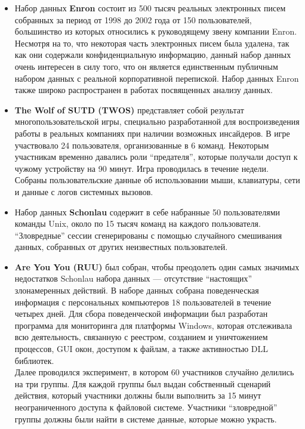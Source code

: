 \begin{itemize}
\item Набор данных \textbf{Enron} состоит из 500 тысяч реальных электронных писем собранных за период от 1998 до 2002 года от 150 пользователей, большинство из которых относились к руководящему звену компании Enron. Несмотря на то, что некоторая часть электронных писем была удалена, так как они содержали конфиденциальную информацию, данный набор данных очень интересен в силу того, что он является единственным публичным набором данных с реальной корпоративной перепиской. Набор данных Enron также широко распространен в работах посвященных анализу данных.\\
\item \textbf{The Wolf of SUTD (TWOS)} представляет собой результат многопользовательской игры, специально разработанной для воспроизведения работы в реальных компаниях при наличии возможных инсайдеров. В игре участвовало 24 пользователя, организованные в 6 команд. Некоторым участникам временно давались роли ``предателя'', которые получали доступ к чужому устройству на 90 минут. Игра проводилась в течение недели. Собраны пользовательские данные об использовании мыши, клавиатуры, сети и данные с логов системных вызовов. \\ 
\item Набор данных \textbf{Schonlau} содержит в себе набранные 50 пользователями команды Unix, около по 15 тысяч команд на каждого пользователя. ``Зловредные'' сессии сгенерированы с помощью случайного смешивания данных, собранных от других неизвестных пользователей.\\
\item \textbf{Are You You (RUU)} был собран, чтобы преодолеть один самых значимых недостатков Schonlau набора данных --- отсутствие ``настоящих'' злонамеренных действий. В наборе данных собрана поведенческая информация с персональных компьютеров 18 пользователей в течение четырех дней. Для сбора поведенческой информации был разработан программа для мониторинга для платформы Windows, которая отслеживала всю деятельность, связанную с реестром, созданием и уничтожением процессов, GUI окон, доступом к файлам, а также активностью DLL библиотек.\\ Далее проводился эксперимент, в котором 60 участников случайно делились на три группы. Для каждой группы был выдан собственный сценарий действия, который участники должны были выполнить за 15 минут неограниченного доступа к файловой системе. Участники ``зловредной'' группы должны были найти в системе данные, которые можно украсть.\\ 

\end{itemize}
